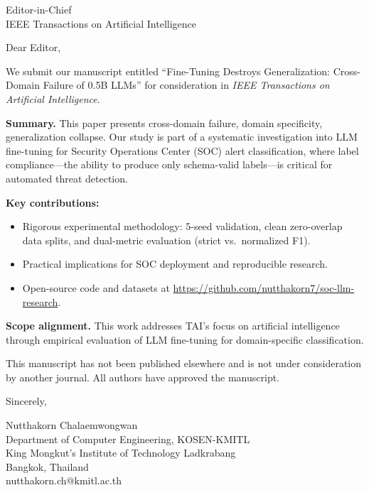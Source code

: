 \documentclass[11pt]{letter}
\begin{document}
\begin{letter}{Editor-in-Chief \\ IEEE Transactions on Artificial Intelligence}

\opening{Dear Editor,}

We submit our manuscript entitled ``Fine-Tuning Destroys Generalization: Cross-Domain Failure of 0.5B LLMs'' for consideration in \textit{IEEE Transactions on Artificial Intelligence}.

\textbf{Summary.} This paper presents cross-domain failure, domain specificity, generalization collapse. Our study is part of a systematic investigation into LLM fine-tuning for Security Operations Center (SOC) alert classification, where label compliance---the ability to produce only schema-valid labels---is critical for automated threat detection.

\textbf{Key contributions:}
\begin{itemize}
\item Rigorous experimental methodology: 5-seed validation, clean zero-overlap data splits, and dual-metric evaluation (strict vs.\ normalized F1).
\item Practical implications for SOC deployment and reproducible research.
\item Open-source code and datasets at \url{https://github.com/nutthakorn7/soc-llm-research}.
\end{itemize}

\textbf{Scope alignment.} This work addresses TAI's focus on artificial intelligence through empirical evaluation of LLM fine-tuning for domain-specific classification.

This manuscript has not been published elsewhere and is not under consideration by another journal. All authors have approved the manuscript.

\closing{Sincerely,}

Nutthakorn Chalaemwongwan \\
Department of Computer Engineering, KOSEN-KMITL \\
King Mongkut's Institute of Technology Ladkrabang \\
Bangkok, Thailand \\
nutthakorn.ch@kmitl.ac.th

\end{letter}
\end{document}
